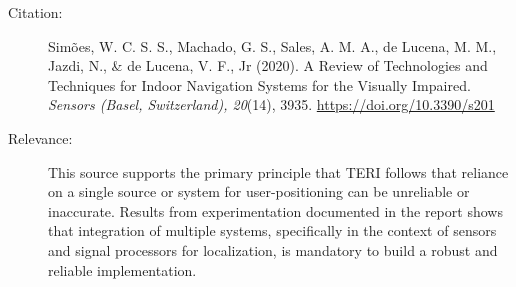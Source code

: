 \documentclass{article}
\begin{document}
\begin{description}
    \item[Citation:] Simões, W. C. S. S., Machado, G. S., Sales, A. M. A., de Lucena, M. M., Jazdi, N., \& de Lucena, V. F., Jr (2020). A Review of Technologies and Techniques for Indoor Navigation Systems for the Visually Impaired. \textit{Sensors (Basel, Switzerland), 20}(14), 3935. \href{https://doi.org/10.3390/s20143935}{https://doi.org/10.3390/s201}
    \item[Relevance:] This source supports the primary principle that TERI follows that reliance on a single source or system for user-positioning can be unreliable or inaccurate. Results from experimentation documented in the report shows that integration of multiple systems, specifically in the context of sensors and signal processors for localization, is mandatory to build a robust and reliable implementation.
\end{description}
\end{document}
